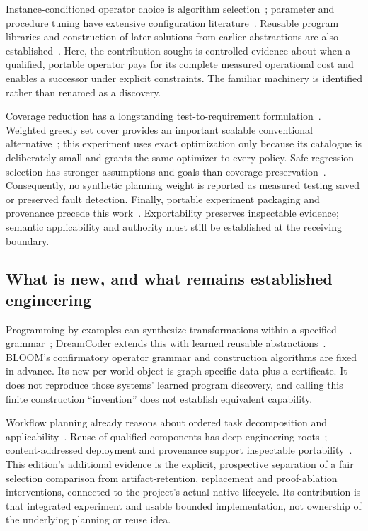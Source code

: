 Instance-conditioned operator choice is algorithm selection~\cite{rice1976selection}; parameter and procedure tuning have extensive configuration literature~\cite{hutter2011smac}. Reusable program libraries and construction of later solutions from earlier abstractions are also established~\cite{ellis2021dreamcoder}. Here, the contribution sought is controlled evidence about when a qualified, portable operator pays for its complete measured operational cost and enables a successor under explicit constraints. The familiar machinery is identified rather than renamed as a discovery.

Coverage reduction has a longstanding test-to-requirement formulation~\cite{harrold1993reduction}. Weighted greedy set cover provides an important scalable conventional alternative~\cite{chvatal1979cover}; this experiment uses exact optimization only because its catalogue is deliberately small and grants the same optimizer to every policy. Safe regression selection has stronger assumptions and goals than coverage preservation~\cite{rothermel1997safe}. Consequently, no synthetic planning weight is reported as measured testing saved or preserved fault detection. Finally, portable experiment packaging and provenance precede this work~\cite{chirigati2013reprozip}. Exportability preserves inspectable evidence; semantic applicability and authority must still be established at the receiving boundary.

\subsection{What is new, and what remains established engineering}
Programming by examples can synthesize transformations within a specified grammar~\cite{gulwani2011strings}; DreamCoder extends this with learned reusable abstractions~\cite{ellis2021dreamcoder}. BLOOM's confirmatory operator grammar and construction algorithms are fixed in advance. Its new per-world object is graph-specific data plus a certificate. It does not reproduce those systems' learned program discovery, and calling this finite construction ``invention'' does not establish equivalent capability.

Workflow planning already reasons about ordered task decomposition and applicability~\cite{nau2003shop2}. Reuse of qualified components has deep engineering roots~\cite{mcilroy1968components}; content-addressed deployment and provenance support inspectable portability~\cite{dolstra2004nix,chirigati2013reprozip}. This edition's additional evidence is the explicit, prospective separation of a fair selection comparison from artifact-retention, replacement and proof-ablation interventions, connected to the project's actual native lifecycle. Its contribution is that integrated experiment and usable bounded implementation, not ownership of the underlying planning or reuse idea.

